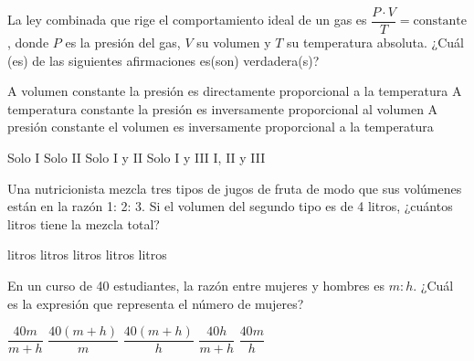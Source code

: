 \documentclass[pagina vacia]{srs}
\begin{document}
\begin{preguntas}
\pregunta La ley combinada que rige el comportamiento ideal de un gas es
$\dfrac{P \cdot V}{T} = \text{constante}$, donde $P$ es la presión del gas,
$V$ su volumen y $T$ su temperatura absoluta. ¿Cuál (es) de las siguientes
afirmaciones es(son) verdadera(s)?
\begin{verticali}
\alternativa A volumen constante la presión es directamente proporcional a la temperatura
\alternativa A temperatura constante la presión es inversamente proporcional al volumen
\alternativa A presión constante el volumen es inversamente proporcional a la temperatura
\end{verticali}
\begin{vertical}
\alternativa Solo I
\alternativa Solo II
\alternativa Solo I y II
\alternativa Solo I y III
\alternativa I, II y III
\end{vertical}

\pregunta Una nutricionista mezcla tres tipos de jugos de fruta de modo que sus
volúmenes están en la razón 1: 2: 3. Si el volumen del segundo tipo es de 4
litros, ¿cuántos litros tiene la mezcla total?
\begin{vertical}
 litros
 litros
 litros
 litros
 litros
\end{vertical}

\pregunta En un curso de 40 estudiantes, la razón entre mujeres y hombres
es $m:h$. ¿Cuál es la expresión que representa el número de mujeres?
\begin{vertical}
\alternativa $\dfrac{40m}{m+h}$
\alternativa $\dfrac{40(m+h)}{m}$
\alternativa $\dfrac{40(m+h)}{h}$
\alternativa $\dfrac{40h}{m+h}$
\alternativa $\dfrac{40m}{h}$
\end{vertical}



\end{preguntas}
\end{document}
